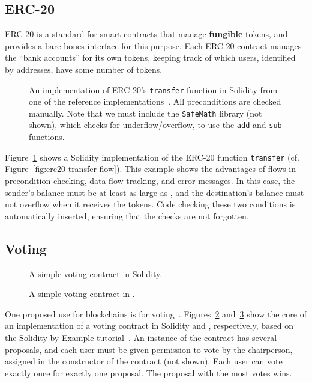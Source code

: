 \documentclass[nonacm, dvipsnames, sigconf]{acmart}
\begin{document}
\subsection{ERC-20}\label{sec:erc20-impl}
ERC-20 is a standard for smart contracts that manage \textbf{fungible} tokens, and provides a bare-bones interface for this purpose.
Each ERC-20 contract manages the ``bank accounts'' for its own tokens, keeping track of which users, identified by addresses, have some number of tokens.
\begin{figure}
    \centering
    
    \caption{An implementation of ERC-20's \lstinline{transfer} function in Solidity from one of the reference implementations~\cite{erc20Consensys}.
        All preconditions are checked manually.
        Note that we must include the \lstinline{SafeMath} library (not shown), which checks for underflow/overflow, to use the \lstinline{add} and \lstinline{sub} functions.}
    \label{fig:erc20-transfer-sol}
\end{figure}
Figure~\ref{fig:erc20-transfer-sol} shows a Solidity implementation of the ERC-20 function \lstinline{transfer} (cf. Figure~\ref{fig:erc20-transfer-flow}).
This example shows the advantages of flows in precondition checking, data-flow tracking, and error messages.
In this case, the sender's balance must be at least as large as , and the destination's balance must not overflow when it receives the tokens.
Code checking these two conditions is automatically inserted, ensuring that the checks are not forgotten.

\subsection{Voting}\label{sec:voting-impl}
\begin{figure}
    \centering
    
    \caption{A simple voting contract in Solidity.}
    \label{fig:voting-impl-sol}
\end{figure}%
\begin{figure}
    \centering
    
    \caption{A simple voting contract in \langName.}
    \label{fig:voting-impl-flow}
\end{figure}
One proposed use for blockchains is for voting~\cite{Elsden18:Making}.
Figures~\ref{fig:voting-impl-sol} and~\ref{fig:voting-impl-flow} show the core of an implementation of a voting contract in Solidity and \langName, respectively, based on the Solidity by Example tutorial~\cite{solidityByExample}.
An instance of the contract has several proposals, and each user must be given permission to vote by the chairperson, assigned in the constructor of the contract (not shown).
Each user can vote exactly once for exactly one proposal.
The proposal with the most votes wins.
\end{document}
